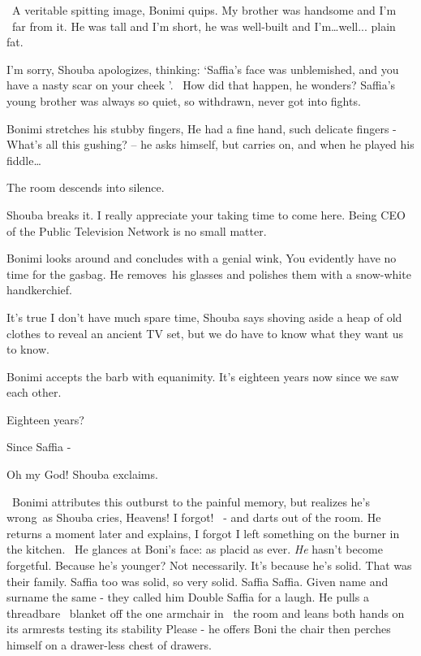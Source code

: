 \documentclass[12pt]{book}
\begin{document}
~{\textquotedbl}A veritable spitting image,{\textquotedbl} Bonimi quips. {\textquotedbl}My brother was handsome and I'm
~far from it. He was tall and I'm short, he was well-built and I'm{\dots}well... plain fat. {\textquotedbl}

{\textquotedbl}I'm sorry,{\textquotedbl} Shouba apologizes, thinking: `Saffia's face was unblemished,
and{ }you have a nasty scar on your cheek '. \ How did that happen, he wonders?
Saffia's young brother was always so quiet, so withdrawn, never got into fights.

Bonimi stretches his stubby fingers, {\textquotedbl}He had a fine hand, such delicate fingers - {\textquotedbl} What's
all this gushing? -- he asks himself, but carries on, {\textquotedbl}and when he played his
fiddle{\dots}{\textquotedbl}

The room descends into silence.

Shouba breaks it. {\textquotedbl}I really appreciate your taking time to come here. Being CEO of the Public Television
Network is no small matter.{\textquotedbl}

Bonimi looks around and concludes with a genial wink, {\textquotedbl}You evidently have no time for the
gasbag.{\textquotedbl} He removes~his glasses and polishes them with a snow-white handkerchief.

{\textquotedbl}It's true I don't have much spare time,{\textquotedbl} Shouba says shoving aside a heap of old clothes to
reveal an ancient TV set, {\textquotedbl}but we do have to know what they want us to know.{\textquotedbl}

Bonimi accepts the barb with equanimity. {\textquotedbl}It's eighteen years now since we saw each other.{\textquotedbl}

{\textquotedbl}Eighteen years?{\textquotedbl}

{\textquotedbl}Since Saffia -{\textquotedbl}

{\textquotedbl}Oh my God!{\textquotedbl} Shouba exclaims.

~Bonimi attributes this outburst to the painful memory, but realizes he's wrong~as Shouba cries,
{\textquotedbl}Heavens!{ }I forgot!{\textquotedbl}
{\ }{}- and darts out of the room. He returns a moment later and explains,
{\textquotedbl}I forgot I left something on the burner in the kitchen.{\textquotedbl}~ He glances at Boni's face: as
placid as ever. \textit{He} hasn't become forgetful. Because he's younger? Not necessarily. It's because he's solid.
That was their family. Saffia too was solid, so very solid. Saffia Saffia. Given name and surname the same - they
called him {\textquotedbl}Double Saffia{\textquotedbl} for a laugh. He pulls a threadbare \ blanket off the one
armchair in~ the room and leans both hands on its armrests testing its stability {\textquotedbl}Please -{\textquotedbl}
he offers Boni the chair then perches himself on a drawer-less chest of drawers.
\end{document}
